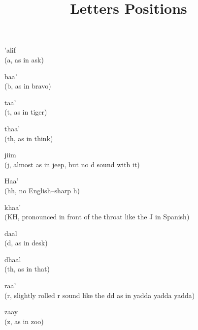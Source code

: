 \documentclass[avery5371,grid,frame]{flashcards}
\title{Letters Positions}
\begin{document}
\begin{flashcard}{\LARGE ’alif \\ (a, as in ask)}
\LARGE {}
\end{flashcard}
\begin{flashcard}{\LARGE baa' \\ (b, as in bravo)}
\LARGE {}
\end{flashcard}
\begin{flashcard}{\LARGE taa' \\ (t, as in tiger)}
\LARGE {}
\end{flashcard}
\begin{flashcard}{\LARGE thaa' \\ (th, as in think)}
\LARGE {}
\end{flashcard}
\begin{flashcard}{\LARGE jiim \\ (j, almost as in jeep, but no d sound with it)}
\LARGE {}
\end{flashcard}
\begin{flashcard}{\LARGE Haa' \\ (hh, no English--sharp h)}
\LARGE {}
\end{flashcard}
\begin{flashcard}{\LARGE khaa' \\ (KH, pronounced in front of the throat like the J in Spanish)}
\LARGE {}
\end{flashcard}
\begin{flashcard}{\LARGE daal \\ (d, as in desk)}
\LARGE {}
\end{flashcard}
\begin{flashcard}{\LARGE dhaal \\ (th, as in that)}
\LARGE {}
\end{flashcard}
\begin{flashcard}{\LARGE raa' \\ (r, slightly rolled r sound like the dd as in yadda yadda yadda)}
\LARGE {}
\end{flashcard}
\begin{flashcard}{\LARGE zaay \\ (z, as in zoo)}
\LARGE {}
\end{flashcard}
\end{document}
